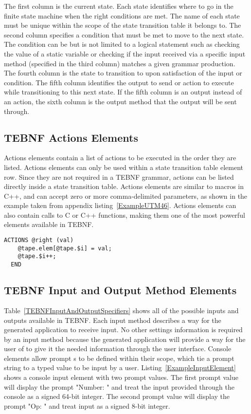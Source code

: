 \indent
The first column is the current state.  Each state identifies where to go in the finite state machine when the right conditions are met.  The name of each state must be unique within the scope of the state transition table it belongs to.  The second column specifies a condition that must be met to move to the next state.  The condition can be but is not limited to a logical statement such as checking the value of a static variable or checking if the input received via a specific input method (specified in the third column) matches a given grammar production.  The fourth column is the state to transition to upon satisfaction of the input or condition.  The fifth column identifies the output to send or action to execute while transitioning to this next state.  If the fifth column is an output instead of an action, the sixth column is the output method that the output will be sent through.

\subsection{TEBNF Actions Elements}
Actions elements contain a list of actions to be executed in the order they are listed.  Actions elements can only be used within a state transition table element row.  Since they are not required in a TEBNF grammar, actions can be listed directly inside a state transition table.  Actions elements are similar to macros in C++, and can accept zero or more comma-delimited parameters, as shown in the example taken from appendix listing~\ref{ExampleUTM46}.  Actions elements can also contain calls to C or C++ functions, making them one of the most powerful elements available in TEBNF.
\begin{lstlisting}[basicstyle=\small,caption={A TEBNF Actions element.},label=ExampleActionsElement]
  ACTIONS @right (val)
    @tape.elem[@tape.$i] = val;
    @tape.$i++;
  END
\end{lstlisting}

\subsection{TEBNF Input and Output Method Elements}
Table~\ref{TEBNFInputAndOutputSpecifiers} shows all of the possible inputs and outputs available in TEBNF.  Each input method describes a way for the generated application to receive input.  No other settings information is required by an input method because the generated application will provide a way for the user of to give it the needed information through the user interface.  Console elements allow prompt s to be defined within their scope, which tie a prompt string to a typed value to be input by a user.  Listing~\ref{ExampleInputElement} shows a console input element with two prompt values.  The first prompt value will display the prompt "Number: " and treat the input provided through the console as a signed 64-bit integer.  The second prompt value will display the prompt "Op: " and treat input as a signed 8-bit integer.

